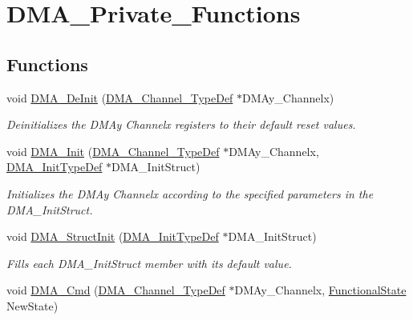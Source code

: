 \hypertarget{group___d_m_a___private___functions}{}\section{D\+M\+A\+\_\+\+Private\+\_\+\+Functions}
\label{group___d_m_a___private___functions}
\subsection*{Functions}
\begin{DoxyCompactItemize}
\item 
void \mbox{\hyperlink{group___d_m_a___private___functions_ga21ca0d50b13e502db5ab5feb484f9ece}{D\+M\+A\+\_\+\+De\+Init}} (\mbox{\hyperlink{struct_d_m_a___channel___type_def}{D\+M\+A\+\_\+\+Channel\+\_\+\+Type\+Def}} $\ast$D\+M\+Ay\+\_\+\+Channelx)
\begin{DoxyCompactList}\small\item\em Deinitializes the D\+M\+Ay Channelx registers to their default reset values. \end{DoxyCompactList}\item 
void \mbox{\hyperlink{group___d_m_a___private___functions_ga7c3d1b9dc041f8e5f2cfc8d5dd858278}{D\+M\+A\+\_\+\+Init}} (\mbox{\hyperlink{struct_d_m_a___channel___type_def}{D\+M\+A\+\_\+\+Channel\+\_\+\+Type\+Def}} $\ast$D\+M\+Ay\+\_\+\+Channelx, \mbox{\hyperlink{struct_d_m_a___init_type_def}{D\+M\+A\+\_\+\+Init\+Type\+Def}} $\ast$D\+M\+A\+\_\+\+Init\+Struct)
\begin{DoxyCompactList}\small\item\em Initializes the D\+M\+Ay Channelx according to the specified parameters in the D\+M\+A\+\_\+\+Init\+Struct. \end{DoxyCompactList}\item 
void \mbox{\hyperlink{group___d_m_a___private___functions_ga0f7f95f750a90a6824f4e9b6f58adc7e}{D\+M\+A\+\_\+\+Struct\+Init}} (\mbox{\hyperlink{struct_d_m_a___init_type_def}{D\+M\+A\+\_\+\+Init\+Type\+Def}} $\ast$D\+M\+A\+\_\+\+Init\+Struct)
\begin{DoxyCompactList}\small\item\em Fills each D\+M\+A\+\_\+\+Init\+Struct member with its default value. \end{DoxyCompactList}\item 
void \mbox{\hyperlink{group___d_m_a___private___functions_ga8e7cb6b9ae5f142e2961df879cdaba65}{D\+M\+A\+\_\+\+Cmd}} (\mbox{\hyperlink{struct_d_m_a___channel___type_def}{D\+M\+A\+\_\+\+Channel\+\_\+\+Type\+Def}} $\ast$D\+M\+Ay\+\_\+\+Channelx, \mbox{\hyperlink{group___exported__types_gac9a7e9a35d2513ec15c3b537aaa4fba1}{Functional\+State}} New\+State)

\end{DoxyCompactItemize}
